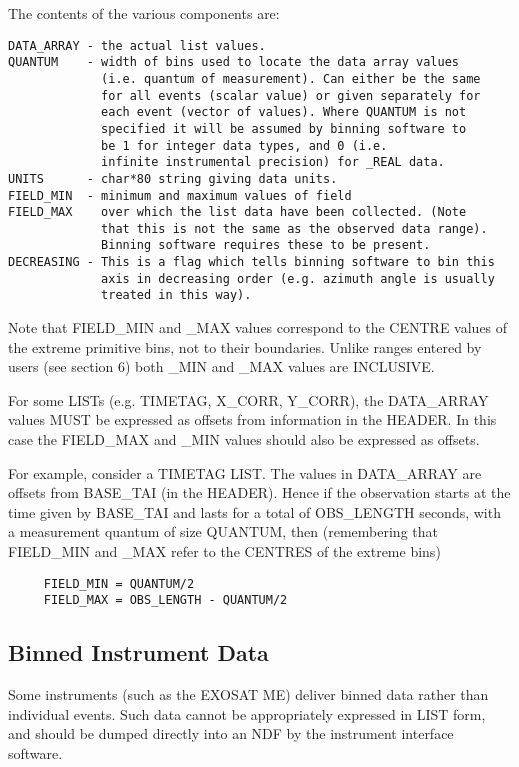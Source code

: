The contents of the various components are:

\begin{verbatim}
DATA_ARRAY - the actual list values. 
QUANTUM    - width of bins used to locate the data array values
             (i.e. quantum of measurement). Can either be the same
             for all events (scalar value) or given separately for
             each event (vector of values). Where QUANTUM is not
             specified it will be assumed by binning software to
             be 1 for integer data types, and 0 (i.e. 
             infinite instrumental precision) for _REAL data.
UNITS      - char*80 string giving data units.
FIELD_MIN  - minimum and maximum values of field
FIELD_MAX    over which the list data have been collected. (Note
             that this is not the same as the observed data range).
             Binning software requires these to be present. 
DECREASING - This is a flag which tells binning software to bin this
             axis in decreasing order (e.g. azimuth angle is usually
             treated in this way).
\end{verbatim}

Note that FIELD\_MIN and \_MAX values correspond to the CENTRE values of
the  extreme  primitive  bins, not to their boundaries.  Unlike ranges
entered by users (see  section  6)  both  \_MIN  and  \_MAX  values  are
INCLUSIVE.

For some LISTs (e.g.  TIMETAG, X\_CORR, Y\_CORR), the DATA\_ARRAY  values
MUST  be expressed as offsets from information in the HEADER.  In this
case the FIELD\_MAX  and  \_MIN  values  should  also  be  expressed  as
offsets.

For example, consider a TIMETAG LIST.  The values  in  DATA\_ARRAY  are
offsets  from  BASE\_TAI  (in  the  HEADER).   Hence if the observation
starts at the time  given  by  BASE\_TAI  and  lasts  for  a  total  of
OBS\_LENGTH  seconds,  with a measurement quantum of size QUANTUM, then
(remembering that FIELD\_MIN and \_MAX  refer  to  the  CENTRES  of  the
extreme bins)
   
\begin{verbatim}
     FIELD_MIN = QUANTUM/2
     FIELD_MAX = OBS_LENGTH - QUANTUM/2
\end{verbatim}

\subsection{Binned Instrument Data}

Some instruments (such as the EXOSAT ME) deliver  binned  data  rather
than  individual  events.  Such data cannot be appropriately expressed
in LIST form, and should  be  dumped  directly  into  an  NDF  by  the
instrument interface software.

